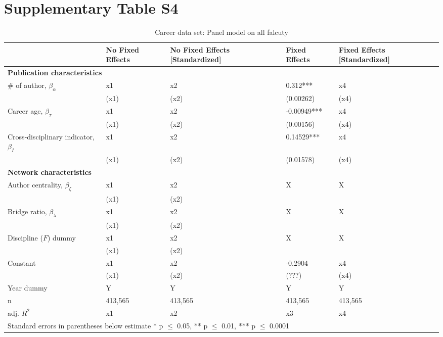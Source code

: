 \documentclass[10pt]{article}          %
\begin{document}
\section{Supplementary Table S4}
\begin{table}[h]
\begin{tabular}{m{5cm} m{3.0cm} m{3cm} m{2.5cm} m{2.7cm}}
\hline
\hline
& \textbf{No Fixed Effects} & \textbf{No Fixed Effects [Standardized]} & \textbf{Fixed Effects} & \textbf{Fixed Effects [Standardized]} \\ \hline
\multicolumn{5}{l}{\textbf{Publication characteristics}} \\
\rowcolor{lightgray}
{\# of author, $\beta_\alpha$} & x1 & x2 & 0.312*** & x4 \\
                             & (x1) & (x2) & (0.00262) & (x4) \\
\rowcolor{lightgray}
{Career age, $\beta_\tau$} & x1 & x2 & -0.00949*** & x4 \\
                         & (x1) & (x2) & (0.00156) & (x4) \\
\rowcolor{lightgray}
{Cross-disciplinary indicator, $\beta_I$} & x1 & x2 & 0.14529*** & x4 \\
                                        & (x1) & (x2) & (0.01578) & (x4) \\ \hline
\multicolumn{5}{l}{\textbf{Network characteristics}} \\
\rowcolor{lightgray}
{Author centrality, $\beta_\zeta$} & x1 & x2 & X & X \\
                             & (x1) & (x2) &  &  \\
\rowcolor{lightgray}
{Bridge ratio, $\beta_\lambda$} & x1 & x2 & X & X \\
                             & (x1) & (x2) &  &  \\
\rowcolor{lightgray}
{Discipline ($F$) dummy}     & x1 & x2 & X & X \\
                             & (x1) & (x2) & &  \\
\rowcolor{lightgray}
{Constant}                 & x1 & x2 & -0.2904 & x4 \\
                         & (x1) & (x2) & (???) & (x4) \\
\rowcolor{lightgray}
{Year dummy}            & Y & Y & Y & Y \\ \hline
\rowcolor{lightgray}
{n}                      & 413,565 & 413,565 & 413,565 & 413,565 \\
\rowcolor{lightgray}
{adj. $R^2$}             & x1 & x2 & x3 & x4 \\ \hline \hline
\multicolumn{5}{l}{\footnotesize{Standard errors in parentheses below estimate * p $\leq$ 0.05, ** p $\leq$ 0.01, *** p $\leq$ 0.0001}}

\end{tabular}
\caption{Career data set: Panel model on all falcuty}
\label{tbl:sT5}
\end{table}
\end{document}
